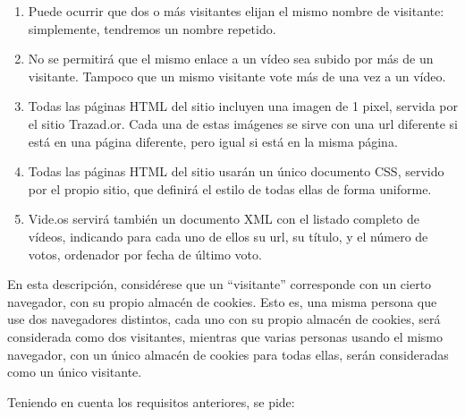 \begin{enumerate}
\item Puede ocurrir que dos o más visitantes elijan el mismo nombre de visitante: simplemente, tendremos un nombre repetido.

\item No se permitirá que el mismo enlace a un vídeo sea subido por más de un visitante. Tampoco que un mismo visitante vote más de una vez a un vídeo.

\item Todas las páginas HTML del sitio incluyen una imagen de 1 pixel, servida por el sitio Trazad.or. Cada una de estas imágenes se sirve con una url diferente si está en una página diferente, pero igual si está en la misma página.

\item Todas las páginas HTML del sitio usarán un único documento CSS, servido por el propio sitio, que definirá el estilo de todas ellas de forma uniforme.

\item Vide.os servirá también un documento XML con el listado completo de vídeos, indicando para cada uno de ellos su url, su título, y el número de votos, ordenador por fecha de último voto.
\end{enumerate}

En esta descripción, considérese que un ``visitante'' corresponde con un cierto navegador, con su propio almacén de cookies. Esto es, una misma persona que use dos navegadores distintos, cada uno con su propio almacén de cookies, será considerada como dos visitantes, mientras que varias personas usando el mismo navegador, con un único almacén de cookies para todas ellas, serán consideradas como un único visitante.

\newpage

Teniendo en cuenta los requisitos anteriores, se pide:

